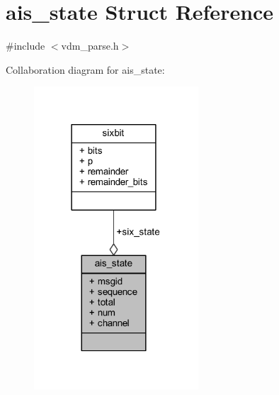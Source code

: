 \hypertarget{structais__state}{}\section{ais\+\_\+state Struct Reference}
\label{structais__state}


{\ttfamily \#include $<$vdm\+\_\+parse.\+h$>$}



Collaboration diagram for ais\+\_\+state\+:
\nopagebreak
\begin{figure}[H]
\begin{center}
\leavevmode
\includegraphics[width=174pt]{structais__state__coll__graph}
\end{center}
\end{figure}
